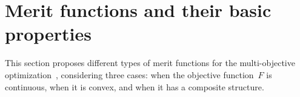 \documentclass[../../main]{subfiles}
\begin{document}
\section{Merit functions and their basic properties} 
This section proposes different types of merit functions for the multi-objective optimization~, considering three cases: when the objective function~$F$ is continuous, when it is convex, and when it has a composite structure.






\end{document}
